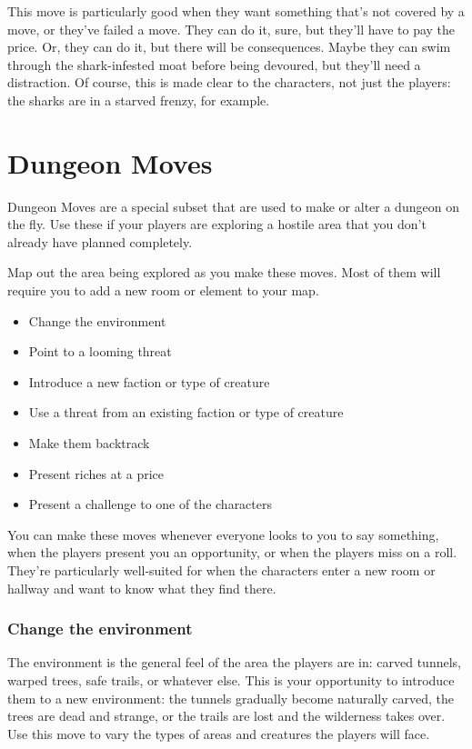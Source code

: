  This move is particularly good when they want something that's not covered by a move, or they've failed a move. They can do it, sure, but they'll have to pay the price. Or, they can do it, but there will be consequences. Maybe they can swim through the shark-infested moat before being devoured, but they'll need a distraction. Of course, this is made clear to the characters, not just the players: the sharks are in a starved frenzy, for example.
\section{Dungeon Moves}


 Dungeon Moves are a special subset that are used to make or alter a dungeon on the fly. Use these if your players are exploring a hostile area that you don't already have planned completely.


 Map out the area being explored as you make these moves. Most of them will require you to add a new room or element to your map.
\begin{itemize}
\item Change the environment
\item Point to a looming threat
\item Introduce a new faction or type of creature
\item Use a threat from an existing faction or type of creature
\item Make them backtrack
\item Present riches at a price
\item Present a challenge to one of the characters

\end{itemize}


 You can make these moves whenever everyone looks to you to say something, when the players present you an opportunity, or when the players miss on a roll. They're particularly well-suited for when the characters enter a new room or hallway and want to know what they find there.
\subsubsection{Change the environment}


 The environment is the general feel of the area the players are in: carved tunnels, warped trees, safe trails, or whatever else. This is your opportunity to introduce them to a new environment: the tunnels gradually become naturally carved, the trees are dead and strange, or the trails are lost and the wilderness takes over. Use this move to vary the types of areas and creatures the players will face.
